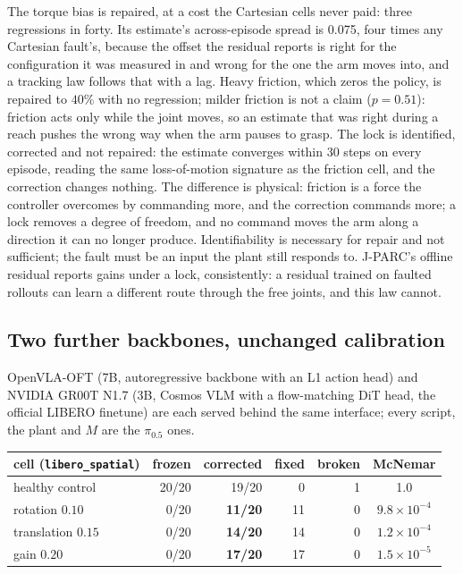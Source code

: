 \documentclass{article}
\newcommand{\code}[1]{\texttt{\small #1}}
\begin{document}
The torque bias is repaired, at a cost the Cartesian cells never paid: three regressions
in forty. Its estimate's across-episode spread is 0.075, four times any Cartesian fault's,
because the offset the residual reports is right for the configuration it was measured in
and wrong for the one the arm moves into, and a tracking law follows that with a lag. Heavy
friction, which zeros the policy, is repaired to $40\%$ with no regression; milder friction
is not a claim ($p=0.51$): friction acts only while the joint moves, so an estimate that
was right during a reach pushes the wrong way when the arm pauses to grasp. The lock is
identified, corrected and not repaired: the estimate converges within 30 steps on every
episode, reading the same loss-of-motion signature as the friction cell, and the correction
changes nothing. The difference is physical: friction is a force the controller overcomes
by commanding more, and the correction commands more; a lock removes a degree of freedom,
and no command moves the arm along a direction it can no longer produce. Identifiability
is necessary for repair and not sufficient; the fault must be an input the plant still
responds to. J-PARC's offline residual
reports gains under a lock, consistently: a residual trained on faulted rollouts can learn
a different route through the free joints, and this law cannot.

\subsection{Two further backbones, unchanged calibration}
\label{sec:oft}

OpenVLA-OFT (7B, autoregressive backbone with an L1 action head) and NVIDIA GR00T N1.7
(3B, Cosmos VLM with a flow-matching DiT head, the official LIBERO finetune) are each
served behind the same interface; every script, the plant and $M$ are the $\pi_{0.5}$ ones.

\begin{center}\small
\begin{tabular}{lrrrrc}
\toprule
cell (\code{libero\_spatial}) & frozen & corrected & fixed & broken & McNemar \\
\midrule
healthy control & 20/20 & 19/20 & 0 & 1 & 1.0 \\
rotation $0.10$ & 0/20 & \textbf{11/20} & 11 & 0 & $9.8\times10^{-4}$ \\
translation $0.15$ & 0/20 & \textbf{14/20} & 14 & 0 & $1.2\times10^{-4}$ \\
gain $0.20$ & 0/20 & \textbf{17/20} & 17 & 0 & $1.5\times10^{-5}$ \\
\bottomrule
\end{tabular}
\end{center}
\end{document}
